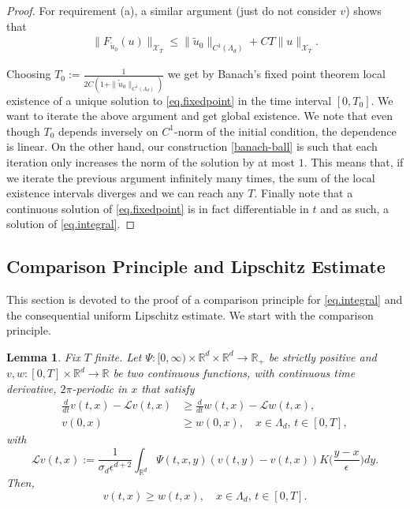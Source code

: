 \documentclass[a4paper,11pt]{amsart}
\newtheorem{lemma}[theorem]{Lemma}
\newcommand{\red}[1]{{#1}}
\newcommand{\R}{\mathbb{R}}
\newcommand{\ep}{\epsilon}
\newcommand{\cX}{\mathcal{X}}
\numberwithin{equation}{section}
\numberwithin{theorem}{section}
\theoremstyle{definition}
\begin{document}
\begin{proof}
For requirement (a), a similar argument (just do not consider $v$) shows that 
\begin{align*}
\|F_{\tilde u_0}(u)\|_{\cX_T}\le \|\tilde u_0\|_{C^1(\Lambda_d)}+CT\|u\|_{\cX_T}.
\end{align*}

Choosing $T_0:=\frac{1}{2C\left(1+\|\tilde u_0\|_{C^1(\Lambda_d)}\right)}$ we get by Banach's fixed point theorem local existence of a unique solution to \eqref{eq.fixedpoint} in the time interval $[0,T_0]$. We want to iterate the above argument and get global existence. We note that even though $T_0$ depends inversely on $C^1$-norm of the initial condition, the dependence is linear. On the other hand, our construction \eqref{banach-ball} is such that each iteration only increases the norm of the solution by at most $1$. This means that, if we iterate the previous argument infinitely many times, the sum of the local existence intervals diverges and we can reach any $T$. Finally note that a continuous solution of \eqref{eq.fixedpoint} is in fact differentiable in $t$ and as such, a solution of \eqref{eq.integral}.
\end{proof}

\subsection{Comparison Principle and Lipschitz Estimate}

This section is devoted to the proof of a comparison principle for \eqref{eq.integral} and the consequential uniform Lipschitz estimate. %
We start with the comparison principle.

\begin{lemma}\label{lem:max}
Fix $T$ finite. Let $\Psi: [0,\infty)\times\R^d\times\R^d\to\R_+$ be strictly positive and $v, w:[0, T]\times\R^d\to\R$ be two continuous functions,  with continuous time derivative, \red{$2\pi$-periodic in $x$} that satisfy
\begin{align}
\frac{d}{dt}v(t,x) - \mathcal L v (t,x) &\geq \frac{d}{dt}w(t,x) - \mathcal L w (t,x), \label{eq:comparison1} \\[4pt]
v(0,x)&\geq  w(0,x), \quad x\in\Lambda_d,\, t\in[0,T],  \label{eq:comparison2}
\end{align}
with 
\[
\mathcal L v (t,x) := \frac{1}{\sigma_d\ep^{d+2}}\int_{\R^d}\Psi(t, x,y)\left(v(t,y)-v(t,x)\right) K\Big(\frac{y-x}{\ep}\Big)dy.
\]
Then,
\[
v(t,x)\geq w(t,x), \quad  x\in\Lambda_d, \, t\in[0,T].
\]
\end{lemma}
\end{document}
